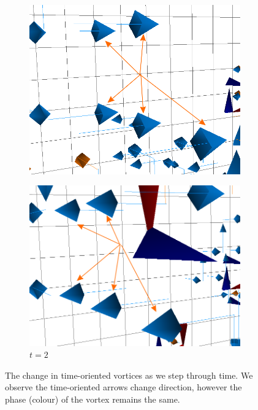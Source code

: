 \begin{figure}[htb!]
\centering
\begin{subfigure}[b]{0.45\textwidth}
\centering
\includegraphics[height=0.2\textheight]{./plaqlinet1_forwardarrows.png}
\end{subfigure}
\hfill
\begin{subfigure}[b]{0.45\textwidth}
\centering
\includegraphics[height=0.2\textheight]{./plaqlinet2_backwardarrows.png}
\caption{\label{fig:VortexArrows2}$t=2$}
\end{subfigure}
\caption[The change in time-oriented vortices as we step through time.]{\label{fig:VortexArrows}The change in time-oriented vortices as we step through time. We observe the time-oriented arrows change direction, however the phase (colour) of the vortex remains the same.}
\end{figure}
